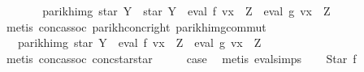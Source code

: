 \begin{isabellebody}
\ \ \isamarkupfalse%
\ \isamarkupfalse%
\ {\isachardoublequoteopen}{\isasymdots}\ {\isacharequal}{\kern0pt}\ parikh{\isacharunderscore}{\kern0pt}img\ {\isacharparenleft}{\kern0pt}star\ Y\ {\isacharat}{\kern0pt}{\isacharat}{\kern0pt}\ star\ Y\ {\isacharat}{\kern0pt}{\isacharat}{\kern0pt}\ eval\ f\ {\isacharparenleft}{\kern0pt}v{\isacharparenleft}{\kern0pt}x\ {\isacharcolon}{\kern0pt}{\isacharequal}{\kern0pt}\ Z{\isacharparenright}{\kern0pt}{\isacharparenright}{\kern0pt}\ {\isacharat}{\kern0pt}{\isacharat}{\kern0pt}\ eval\ g\ {\isacharparenleft}{\kern0pt}v{\isacharparenleft}{\kern0pt}x\ {\isacharcolon}{\kern0pt}{\isacharequal}{\kern0pt}\ Z{\isacharparenright}{\kern0pt}{\isacharparenright}{\kern0pt}{\isacharparenright}{\kern0pt}{\isachardoublequoteclose}\isanewline
\ \ \ \ \isamarkupfalse%
\ {\isacharparenleft}{\kern0pt}metis\ conc{\isacharunderscore}{\kern0pt}assoc\ parikh{\isacharunderscore}{\kern0pt}conc{\isacharunderscore}{\kern0pt}right\ parikh{\isacharunderscore}{\kern0pt}img{\isacharunderscore}{\kern0pt}commut{\isacharparenright}{\kern0pt}\isanewline
\ \ \isamarkupfalse%
\ \isamarkupfalse%
\ {\isachardoublequoteopen}{\isasymdots}\ {\isacharequal}{\kern0pt}\ parikh{\isacharunderscore}{\kern0pt}img\ {\isacharparenleft}{\kern0pt}star\ Y\ {\isacharat}{\kern0pt}{\isacharat}{\kern0pt}\ eval\ f\ {\isacharparenleft}{\kern0pt}v{\isacharparenleft}{\kern0pt}x\ {\isacharcolon}{\kern0pt}{\isacharequal}{\kern0pt}\ Z{\isacharparenright}{\kern0pt}{\isacharparenright}{\kern0pt}\ {\isacharat}{\kern0pt}{\isacharat}{\kern0pt}\ eval\ g\ {\isacharparenleft}{\kern0pt}v{\isacharparenleft}{\kern0pt}x\ {\isacharcolon}{\kern0pt}{\isacharequal}{\kern0pt}\ Z{\isacharparenright}{\kern0pt}{\isacharparenright}{\kern0pt}{\isacharparenright}{\kern0pt}{\isachardoublequoteclose}\isanewline
\ \ \ \ \isamarkupfalse%
\ {\isacharparenleft}{\kern0pt}metis\ conc{\isacharunderscore}{\kern0pt}assoc\ conc{\isacharunderscore}{\kern0pt}star{\isacharunderscore}{\kern0pt}star{\isacharparenright}{\kern0pt}\isanewline
\ \ \isamarkupfalse%
\ \isamarkupfalse%
\ {\isacharquery}{\kern0pt}case\ \isamarkupfalse%
\ {\isacharparenleft}{\kern0pt}metis\ eval{\isachardot}{\kern0pt}simps{\isacharparenleft}{\kern0pt}{}{\isacharparenright}{\kern0pt}{\isacharparenright}{\kern0pt}\isanewline
{}\isamarkupfalse%
\isanewline
\ \ \isamarkupfalse%
\ {\isacharparenleft}{\kern0pt}Star\ f{\isacharparenright}{\kern0pt}\isanewline

\end{isabellebody}
